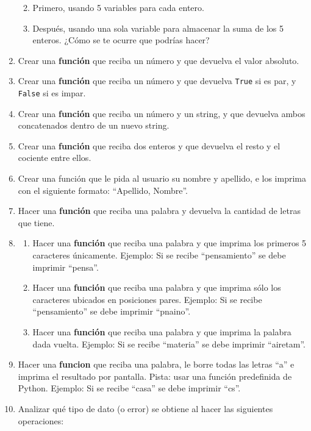 \documentclass[
  letterpaper,
  DIV=11,
  numbers=noendperiod]{scrreprt}
\providecommand{\tightlist}{%
  \setlength{\itemsep}{0pt}\setlength{\parskip}{0pt}}\usepackage{longtable,booktabs,array}
\begin{document}
\begin{enumerate}
  \begin{enumerate}
  \def\labelenumii{\alph{enumii}.}
  \tightlist
  \item
    Primero, usando 5 variables para cada entero.
  \item
    Después, usando una sola variable para almacenar la suma de los 5
    enteros. ¿Cómo se te ocurre que podrías hacer?
  \end{enumerate}
\item
  Crear una \textbf{función} que reciba un número y que devuelva el
  valor absoluto.
\item
  Crear una \textbf{función} que reciba un número y que devuelva
  \texttt{True} si es par, y \texttt{False} si es impar.
\item
  Crear una \textbf{función} que reciba un número y un string, y que
  devuelva ambos concatenados dentro de un nuevo string.
\item
  Crear una \textbf{función} que reciba dos enteros y que devuelva el
  resto y el cociente entre ellos.
\item
  Crear una función que le pida al usuario su nombre y apellido, e los
  imprima con el siguiente formato: ``Apellido, Nombre''.
\item
  Hacer una \textbf{función} que reciba una palabra y devuelva la
  cantidad de letras que tiene.
\item
  \begin{enumerate}
  \def\labelenumii{\alph{enumii}.}
  \tightlist
  \item
    Hacer una \textbf{función} que reciba una palabra y que imprima los
    primeros 5 caracteres únicamente. Ejemplo: Si se recibe
    ``pensamiento'' se debe imprimir ``pensa''.
  \item
    Hacer una \textbf{función} que reciba una palabra y que imprima sólo
    los caracteres ubicados en posiciones pares. Ejemplo: Si se recibe
    ``pensamiento'' se debe imprimir ``pnaino''.
  \item
    Hacer una \textbf{función} que reciba una palabra y que imprima la
    palabra dada vuelta. Ejemplo: Si se recibe ``materia'' se debe
    imprimir ``airetam''.
  \end{enumerate}
\item
  Hacer una \textbf{funcion} que reciba una palabra, le borre todas las
  letras ``a'' e imprima el resultado por pantalla. Pista: usar una
  función predefinida de Python. Ejemplo: Si se recibe ``casa'' se debe
  imprimir ``cs''.
\item
  Analizar qué tipo de dato (o error) se obtiene al hacer las siguientes
  operaciones:


\end{enumerate}
\end{document}
